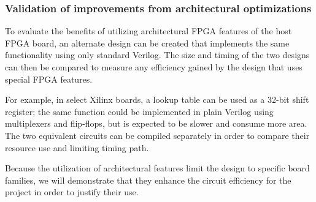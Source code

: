 \subsubsection{Validation of improvements from architectural optimizations}

To evaluate the benefits of utilizing architectural FPGA features of the host FPGA board, an alternate design can be created that implements the same functionality using only standard Verilog.
The size and timing of the two designs can then be compared to measure any efficiency gained by the design that uses special FPGA features.

For example, in select Xilinx boards, a lookup table can be used as a 32-bit shift register; the same function could be implemented in plain Verilog using multiplexers and flip-flops, but is expected to be slower and consume more area.
The two equivalent circuits can be compiled separately in order to compare their resource use and limiting timing path.

Because the utilization of architectural features limit the design to specific board families, we will demonstrate that they enhance the circuit efficiency for the project in order to justify their use.


